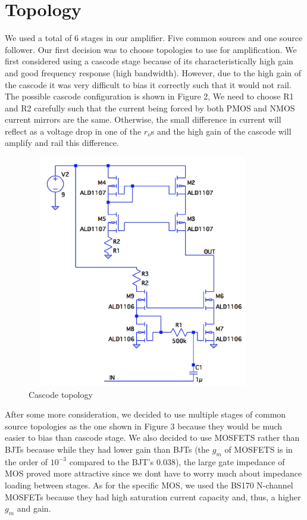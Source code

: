 \documentclass[11pt, twoside, letterpaper]{article}
\begin{document}
\section{Topology}
We used a total of 6 stages in our amplifier. Five common sources and one source follower.
Our first decision was to choose topologies to use for amplification. We first considered using a cascode stage because of 
its characteristically high gain and good frequency response (high bandwidth). However, due to the high gain of the cascode
it was very difficult to bias it correctly such that it would not rail. The possible cascode configuration is shown in Figure 2,
We need to choose R1 and R2 carefully such that the current being forced by both PMOS and NMOS current mirrors are the same.
Otherwise, the small difference in current will reflect as a voltage drop in one of the $r_o$s and the high gain of the cascode
will amplify and rail this difference.
\begin{figure}[htbp]
\begin{center}
\includegraphics[width=4in,height=4in]{Cascode.png}
\caption{Cascode topology}
\end{center}
\end{figure}
\FloatBarrier

After some more consideration, we decided to use multiple stages of common source topologies as the one shown in Figure 3 because they would 
be much easier to bias than cascode stage. We also decided to use MOSFETS rather than BJTs because while they had lower gain than BJTs (the $g_m$ of MOSFETS
is in the order of $10^{-3}$ compared to the BJT's $0.038$), the large gate impedance of MOS proved more attractive since we dont have to
worry much about impedance loading between stages. As for the specific MOS, we used the BS170 N-channel MOSFETs because they had high saturation
current capacity and, thus, a higher $g_m$ and gain.
\end{document}
